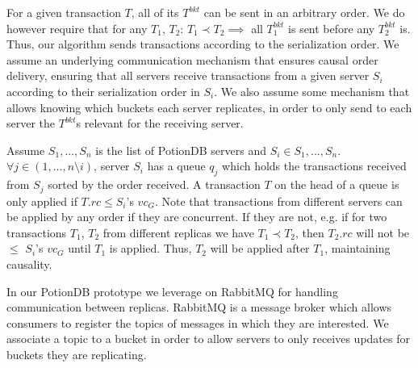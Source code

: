 \documentclass{vldb}
\begin{document}
For a given transaction $T$, all of its $T^{bkt}$ can be sent in an arbitrary order.
We do however require that for any $T_1$, $T_2$: $T_1 \prec T_2 \implies$ all $T_1^{bkt}$ is sent before any $T_2^{bkt}$ is.
Thus, our algorithm sends transactions according to the serialization order.
We assume an underlying communication mechanism that ensures causal order delivery, ensuring that all servers receive transactions from a given server $S_i$ according to their serialization order in $S_i$.
We also assume some mechanism that allows knowing which buckets each server replicates, in order to only send to each server the $T^{bkt}$s relevant for the receiving server.

Assume $S_1, ..., S_n$ is the list of PotionDB servers and $S_i \in S_1, ..., S_n$.
$\forall j \in (1, ..., n \setminus i)$, server $S_i$ has a queue $q_j$ which holds the transactions received from $S_j$ sorted by the order received.
A transaction $T$ on the head of a queue is only applied if $T.rc \leq S_i$'s $vc_G$.
Note that transactions from different servers can be applied by any order if they are concurrent. 
If they are not, e.g. if for two transactions $T_1$, $T_2$ from different replicas we have $T_1 \prec T_2$, then $T_2.rc$ will not be $\leq$ $S_i$'s $vc_G$ until $T_1$ is applied.
Thus, $T_2$ will be applied after $T_1$, maintaining causality. %

In our PotionDB prototype we leverage on RabbitMQ \cite{???} for handling communication between replicas.
RabbitMQ is a message broker which allows consumers to register the topics of messages in which they are interested.
We associate a topic to a bucket in order to allow servers to only receives updates for buckets they are replicating.
\end{document}
